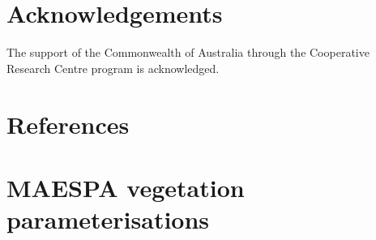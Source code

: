 \documentclass[final,3p,times,authoryear]{elsarticle}
\begin{document}
\section*{Acknowledgements}
The support of the Commonwealth of Australia through the Cooperative Research Centre program is acknowledged.

\section*{References}\label{sec:ref}
   
  


\begin{thebibliography}{00}


\bibitem[ ()]{}

\end{thebibliography}


\appendix
\setcounter{table}{0}
\renewcommand{\thetable}{A\arabic{table}}



\section{MAESPA vegetation parameterisations}\label{sec:maespavegpara}  
%
\end{document}
